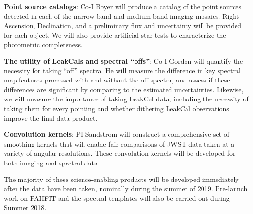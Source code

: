 \documentclass[12pt]{article}
\begin{document}
{\bf Point source catalogs}: Co-I Boyer will produce a catalog of the point sources detected in each of the narrow band and medium band imaging mosaics.  Right Ascension, Declination, and a preliminary flux and uncertainty will be provided for each object. We will also provide artificial star tests to characterize the photometric completeness. 

{\bf The utility of LeakCals and spectral ``offs''}: Co-I Gordon will quantify the necessity for taking ``off'' spectra.  He will measure the difference in key spectral map features processed with and without the off spectra, and assess if these differences are significant by comparing to the estimated uncertainties. Likewise, we will measure the importance of taking LeakCal data, including the necessity of taking them for every pointing and whether dithering LeakCal observations improve the final data product.

{\bf Convolution kernels}: PI Sandstrom will construct a comprehensive set of smoothing kernels that will enable fair comparisons of JWST data taken at a variety of angular resolutions.  These convolution kernels will be developed for both imaging and spectral data.

The majority of these science-enabling products will be developed immediately after the data have been taken, nominally during the summer of 2019.  Pre-launch work on PAHFIT and the spectral templates will also be carried out during Summer 2018.

\end{document}
